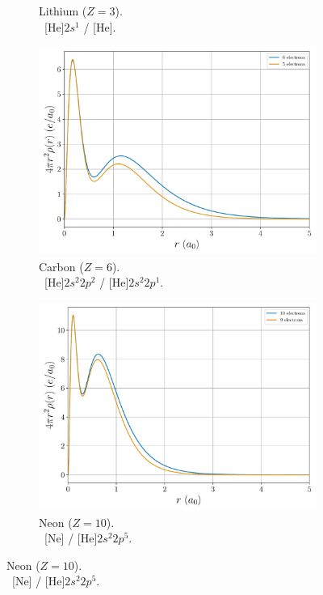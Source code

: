 \documentclass[a4paper,DIV=12,english]{scrartcl}
\begin{document}
\begin{figure}
\begin{subfigure}{0.49\textwidth}
        \caption{Lithium ($Z=3$). \\ \ [He]$2s^1$ / [He].}
        \label{subfig:wf3}
    \end{subfigure}
    \begin{subfigure}{0.49\textwidth}
        \centering
        \includegraphics[width=\textwidth]{../plots/density/density_6.pdf}
        \caption{Carbon ($Z=6$). \\ \ [He]$2s^2 2p^2$ / [He]$2s^2 2p^1$.}
        \label{subfig:wf6}
    \end{subfigure}
    \begin{subfigure}{0.49\textwidth}
        \centering
        \includegraphics[width=\textwidth]{../plots/density/density_10.pdf}
        \caption{Neon ($Z=10$). \\ \ [Ne] / [He]$2s^2 2p^5$.}

\end{subfigure}
\end{figure}
\end{document}
